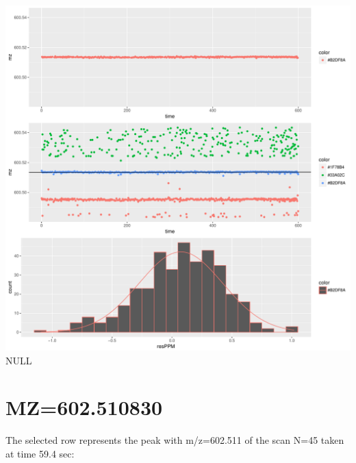 \documentclass[]{article}
\newenvironment{Shaded}{\begin{snugshade}}{\end{snugshade}}
\newcommand{\KeywordTok}[1]{\textcolor[rgb]{0.13,0.29,0.53}{\textbf{#1}}}
\newcommand{\FloatTok}[1]{\textcolor[rgb]{0.00,0.00,0.81}{#1}}
\newcommand{\OperatorTok}[1]{\textcolor[rgb]{0.81,0.36,0.00}{\textbf{#1}}}
\newcommand{\NormalTok}[1]{#1}
\begin{document}
\includegraphics{Supplementary_document_files/figure-latex/filter.lm.600-1.pdf}
NULL

\section{MZ=602.510830}\label{mz602.510830}

\begin{Shaded}
\end{Shaded}

The selected row represents the peak with m/z=602.511 of the scan N=45
taken at time 59.4 sec:

\begin{Shaded}
\end{Shaded}
\end{document}
